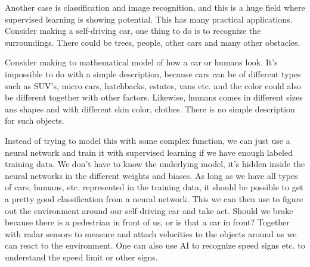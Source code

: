 \documentclass[12pt,a4paper]{article} %
\numberwithin{equation}{section}
\begin{document}
			Another case is classification and image recognition, and this is a huge field where supervised learning is showing potential. This has many practical applications. Consider making a self-driving car, one thing to do is to recognize the surroundings. There could be trees, people, other cars and many other obstacles. 
			
			Consider making to mathematical model of how a car or humans look. It's impossible to do with a simple description, because cars can be of different types such as SUV's, micro cars, hatchbacks, estates, vans etc. and the color could also be different together with other factors. Likewise, humans comes in different sizes ans shapes and with different skin color, clothes. There is no simple description for such objects.
			
			Instead of trying to model this with some complex function, we can just use a neural network and train it with supervised learning if we have enough labeled training data. We don't have to know the underlying model, it's hidden inside the neural networks in the different weights and biases. As long as we have all types of cars, humans, etc. represented in the training data, it should be possible to get a pretty good classification from a neural network. This we can then use to figure out the environment around our self-driving car and take act. Should we brake because there is a pedestrian in front of us, or is that a car in front? Together with radar sensors to measure and attach velocities to the objects around us we can react to the environment. One can also use AI to recognize speed signs etc. to understand the speed limit or other signs.
			
\end{document}
